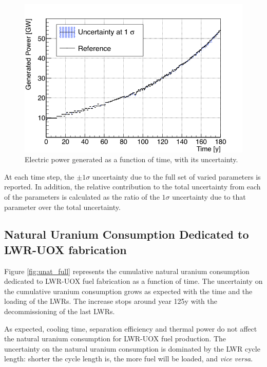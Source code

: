 \documentclass{anstrans}
\begin{document}
\begin{figure}[t] %
    \centering
    \includegraphics[scale=0.3]{power_full}
    \caption{Electric power generated as a function of time, with its uncertainty.}\label{fig:power_full}
\end{figure}

At each time step, the $\pm1\sigma$ uncertainty due to the full set of varied
parameters is reported.  In addition, the relative contribution to the total
uncertainty from each of the parameters is calculated as the ratio of the
$1\sigma$ uncertainty due to that parameter over the total uncertainty.


\subsection{Natural Uranium Consumption Dedicated to \gls{LWR}-\gls{UOX} fabrication}

Figure \ref{fig:unat_full} represents the cumulative natural uranium consumption
dedicated to \gls{LWR}-\gls{UOX} fuel fabrication as a function of time.  The
uncertainty on the cumulative uranium consumption grows as expected with the
time and the loading of the \glspl{LWR}.  The increase stops around year 125y
with the decommissioning of the last \glspl{LWR}.

As expected, cooling time, separation efficiency and thermal power do not affect
the natural uranium consumption for \gls{LWR}-\gls{UOX} fuel production.  The
uncertainty on the natural uranium consumption is dominated by the \gls{LWR}
cycle length: shorter the cycle length is, the more fuel will be loaded, and
\emph{vice versa}.
\end{document}

